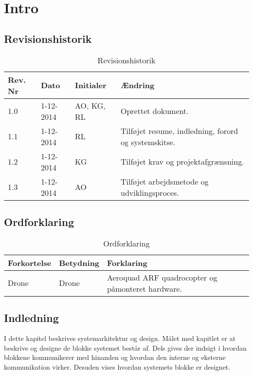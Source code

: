 \chapter{Intro}

\section{Revisionshistorik}
\begin{table}[H]
	\centering
		\begin{tabular}{|p{1.7 cm}|p{2 cm}|p{2.5 cm}|p{6.8 cm}|} 
		\hline
			\textbf{Rev. Nr} & \textbf{Dato}		& \textbf{Initialer} 	& \textbf{Ændring} \\ \hline
			1.0 	& 1-12-2014 & AO, KG, RL  & Oprettet dokument.  \\ \hline
			1.1 	& 1-12-2014 & RL  & Tilføjet resume, indledning, forord og systemskitse. \\ \hline
			1.2 	& 1-12-2014 & KG  & Tilføjet krav og projektafgrænsning. 	\\ \hline
			1.3 	& 1-12-2014 & AO  & Tilføjet arbejdsmetode og \newline udviklingsproces.	\\ \hline

		\end{tabular}
	\caption{Revisionshistorik}
\end{table}


\vspace{1.5cm}

\section{Ordforklaring}
\begin{table}[H]
	\centering
		\begin{tabular}{|p{2.6cm}|p{4.5 cm}|p{6.5 cm}|} 
		\hline
			\textbf{Forkortelse} & \textbf{Betydning} & \textbf{Forklaring} \\ \hline
			 Drone & Drone & Aeroquad ARF quadrocopter og \newline påmonteret hardware. \\ \hline
		\end{tabular}
	\caption{Ordforklaring}
\end{table}

\vspace{1cm}

\section{Indledning}
I dette kapitel beskrives systemarkitektur og design. Målet med kapitlet er at beskrive og designe de blokke systemet består af. Dels gives der indsigt i hvordan blokkene kommunikerer med hinanden og hvordan den interne og eksterne kommunikation virker. Desuden vises hvordan systemets blokke er designet. 